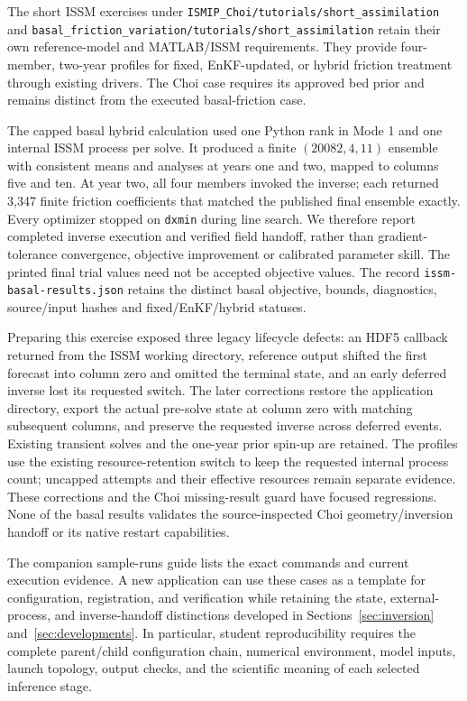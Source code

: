 \documentclass[11pt,a4paper]{article}
\newcommand{\code}[1]{\nolinkurl{#1}}
\begin{document}
The short ISSM exercises under \code{ISMIP_Choi/tutorials/short_assimilation} and \code{basal_friction_variation/tutorials/short_assimilation} retain their own reference-model and MATLAB/ISSM requirements. They provide four-member, two-year profiles for fixed, EnKF-updated, or hybrid friction treatment through existing drivers. The Choi case requires its approved bed prior and remains distinct from the executed basal-friction case.

The capped basal hybrid calculation used one Python rank in Mode 1 and one internal ISSM process per solve. It produced a finite \((20082,4,11)\) ensemble with consistent means and analyses at years one and two, mapped to columns five and ten. At year two, all four members invoked the inverse; each returned 3,347 finite friction coefficients that matched the published final ensemble exactly. Every optimizer stopped on \code{dxmin} during line search. We therefore report completed inverse execution and verified field handoff, rather than gradient-tolerance convergence, objective improvement or calibrated parameter skill. The printed final trial values need not be accepted objective values. The record \code{issm-basal-results.json} retains the distinct basal objective, bounds, diagnostics, source/input hashes and fixed/EnKF/hybrid statuses.

Preparing this exercise exposed three legacy lifecycle defects: an HDF5 callback returned from the ISSM working directory, reference output shifted the first forecast into column zero and omitted the terminal state, and an early deferred inverse lost its requested switch. The later corrections restore the application directory, export the actual pre-solve state at column zero with matching subsequent columns, and preserve the requested inverse across deferred events. Existing transient solves and the one-year prior spin-up are retained. The profiles use the existing resource-retention switch to keep the requested internal process count; uncapped attempts and their effective resources remain separate evidence. These corrections and the Choi missing-result guard have focused regressions. None of the basal results validates the source-inspected Choi geometry/inversion handoff or its native restart capabilities.

The companion sample-runs guide lists the exact commands and current execution evidence. A new application can use these cases as a template for configuration, registration, and verification while retaining the state, external-process, and inverse-handoff distinctions developed in Sections~\ref{sec:inversion} and~\ref{sec:developments}. In particular, student reproducibility requires the complete parent/child configuration chain, numerical environment, model inputs, launch topology, output checks, and the scientific meaning of each selected inference stage.
\end{document}
